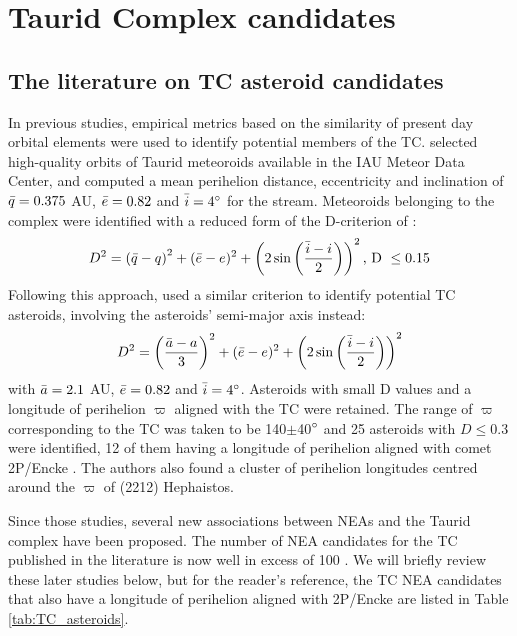 \documentclass[letters,a4paper,fleqn,usenatbib]{mnras}
\begin{document}
\section{Taurid Complex candidates}

\subsection{The literature on TC asteroid candidates} \label{sec:litterature}

In previous studies, empirical metrics based on the similarity of present day orbital elements were used to identify potential members of the TC. \cite{Steel1991} selected high-quality orbits of Taurid meteoroids available in the IAU Meteor Data Center, and computed a mean perihelion distance, eccentricity and inclination of $\Bar{q}=0.375$ AU, $\Bar{e}=0.82$ and $\Bar{i}=4\degree$ for the stream. Meteoroids belonging to the complex were identified with a reduced form of the D-criterion of \cite{Southworth1963}: 
\begin{equation}
  D^2=\left(\Bar{q}-q\right)^2+(\Bar{e}-e)^2+\left(2\sin\left(\frac{\Bar{i}-i}{2}\right)\right)^2\text{,  D }\leq0.15
\end{equation}
Following this approach, \cite{Asher1993,Asher1994} used a similar criterion to identify potential TC asteroids, involving the asteroids' semi-major axis instead: 
\begin{equation}
D^2=\left(\frac{\Bar{a}-a}{3}\right)^2+(\Bar{e}-e)^2+\left(2\sin\left(\frac{\Bar{i}-i}{2}\right)\right)^2
\end{equation}
with $\Bar{a}=2.1$ AU, $\Bar{e}=0.82$ and $\Bar{i}=4\degree$. Asteroids with small D values and a longitude of perihelion $\varpi$ aligned with the TC were retained. The range of $\varpi$ corresponding to the TC was taken to be 140$\pm$40$\degree$ \citep{Steel1991} and 25 asteroids with $D\leq0.3$ were identified, 12 of them having a longitude of perihelion aligned with comet 2P/Encke \citep{Asher1993}. The authors also found a cluster of perihelion longitudes centred around the $\varpi$ of (2212) Hephaistos. 

Since those studies, several new associations between NEAs and the Taurid complex have been proposed. The number of NEA candidates for the TC published in the literature is now well in excess of 100 \citep{Tubiana2015}. We will briefly review these later studies below, but for the reader's reference, the TC NEA candidates that also have a longitude of perihelion aligned with 2P/Encke are listed in Table \ref{tab:TC_asteroids}. 
\end{document}
